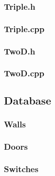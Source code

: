 \documentclass{article}
\begin{document}
\subsubsection{Triple.h}
	
	 				
\subsubsection{Triple.cpp}
	
	 				
\subsubsection{TwoD.h}
	

\subsubsection{TwoD.cpp}	
	

\subsection{Database}
	
\subsubsection{Walls}

\tiny{}

\setlength{\tabcolsep}{2.5pt}

\small{}
\subsubsection{Doors}

\subsubsection{Switches}
\end{document}
